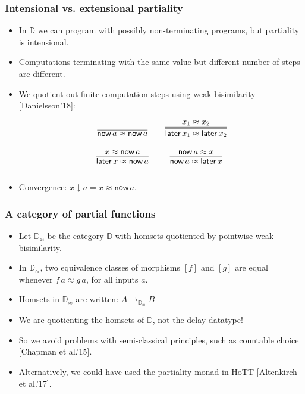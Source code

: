 \documentclass[12pt,t]{beamer}
\newcommand{\red}[1]{\textcolor{red}{#1}}
\newcommand{\now}{\mathsf{now}}
\newcommand{\later}{\mathsf{later}}
\newcommand{\dn}{\downarrow}
\newcommand{\D}{\mathbb{D}}
\newcommand{\Dapprox}{\mathbb{D}_{\approx}}
\begin{document}
\begin{frame}

  \frametitle{Intensional vs. extensional partiality}
  \begin{itemize}
  \item In $\D$ we can program with possibly non-terminating
    programs, but partiality is intensional.
  \item Computations terminating with the same value but 
    different number of steps are different.
  \item We quotient out finite computation steps using weak
    bisimilarity [Danielsson'18]:
    \[
      \arraycolsep=10pt\def\arraystretch{2.8}
      \begin{array}{cc}
        \infer{\now\,a \approx \now\,a}{}
        &
        \infer={\later\,x_1 \approx \later\,x_2}{x_1 \approx x_2}
        \\
        \infer{\later\,x \approx \now\,a}{x \approx \now \,a}
        &
        \infer{\now\,a \approx \later\,x}{\now\,a \approx x}
      \end{array}
    \]
    \item Convergence: $x \dn a = x \approx \now\,a$.
  \end{itemize}
  
  
\end{frame}

\begin{frame}

  \frametitle{A category of partial functions}
  \begin{itemize}
    \item Let $\Dapprox$ be the category $\D$ with homsets
      quotiented by pointwise weak bisimilarity.
    \item In $\Dapprox$, two equivalence classes of morphisms $[f]$ and $[g]$ are equal whenever
      $f \, a \approx g \, a$, for all inputs $a$.
    \item Homsets in $\Dapprox$ are written: $A \to_{\Dapprox} B$   
      \pause
      \vspace{\fill}
    \item We are quotienting the homsets of $\D$, not the delay datatype!
    \item So we avoid problems with semi-classical principles, such as countable choice [Chapman et al.'15].
    \item Alternatively, we could have used the partiality monad in
      HoTT [Altenkirch et al.'17].

  \end{itemize}
  
  
\end{frame}
\end{document}
